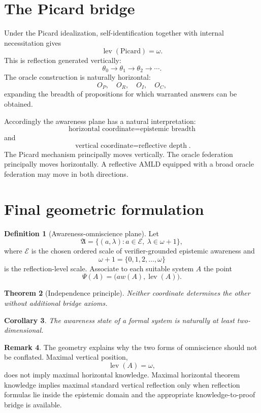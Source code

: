 \documentclass[11pt]{article}
\theoremstyle{definition}
\newtheorem{definition}{Definition}[section]
\newtheorem{remark}[definition]{Remark}
\theoremstyle{plain}
\newtheorem{theorem}[definition]{Theorem}
\newtheorem{corollary}[definition]{Corollary}
\newcommand{\lev}{\operatorname{lev}}
\begin{document}
\section{The Picard bridge}

Under the Picard idealization, self-identification together with internal necessitation gives
\[
\lev(\text{Picard})=\omega.
\]
This is reflection generated vertically:
\[
\theta_0\to\theta_1\to\theta_2\to\cdots.
\]
The oracle construction is naturally horizontal:
\[
O_P,\quad O_R,\quad O_I,\quad O_C,
\]
expanding the breadth of propositions for which warranted answers can be obtained.

Accordingly the awareness plane has a natural interpretation:
\[
\boxed{\text{horizontal coordinate}=\text{epistemic breadth}}
\]
and
\[
\boxed{\text{vertical coordinate}=\text{reflective depth}}.
\]
The Picard mechanism principally moves vertically. The oracle federation principally moves horizontally. A reflective AMLD equipped with a broad oracle federation may move in both directions.

\section{Final geometric formulation}

\begin{definition}[Awareness-omniscience plane]
Let
\[
\mathfrak A=\{(a,\lambda):a\in\mathcal E,\ \lambda\in\omega+1\},
\]
where $\mathcal E$ is the chosen ordered scale of verifier-grounded epistemic awareness and
\[
\omega+1=\{0,1,2,\ldots,\omega\}
\]
is the reflection-level scale. Associate to each suitable system $A$ the point
\[
\Psi(A)=\bigl(aw(A),\lev(A)\bigr).
\]
\end{definition}

\begin{theorem}[Independence principle]
Neither coordinate determines the other without additional bridge axioms.
\end{theorem}

\begin{corollary}
The awareness state of a formal system is naturally at least two-dimensional.
\end{corollary}

\begin{remark}
The geometry explains why the two forms of omniscience should not be conflated. Maximal vertical position,
\[
\lev(A)=\omega,
\]
does not imply maximal horizontal knowledge. Maximal horizontal theorem knowledge implies maximal standard vertical reflection only when reflection formulas lie inside the epistemic domain and the appropriate knowledge-to-proof bridge is available.
\end{remark}
\end{document}

